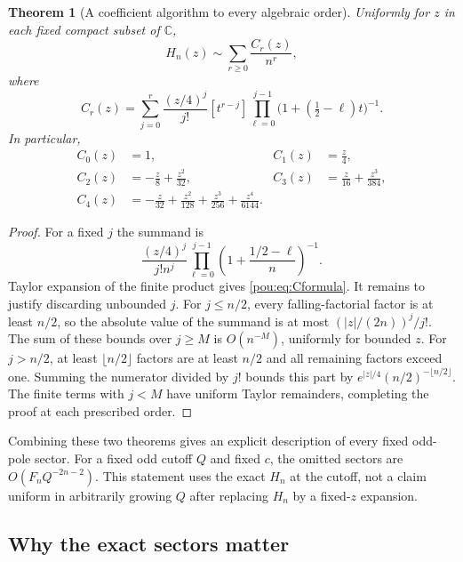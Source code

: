 \documentclass[11pt]{article}
\newtheorem{theorem}{Theorem}[section]
\theoremstyle{definition}
\theoremstyle{remark}
\begin{document}
\begin{theorem}[A coefficient algorithm to every algebraic order]
\label{pou:thm:Hallorders}
Uniformly for $z$ in each fixed compact subset of $\mathbb C$,
\begin{equation}\label{pou:eq:Hexpansion}
 H_n(z)\sim\sum_{r\ge0}\frac{C_r(z)}{n^r},
\end{equation}
where
\begin{equation}\label{pou:eq:Cformula}
 C_r(z)=\sum_{j=0}^r\frac{(z/4)^j}{j!}
 [t^{r-j}]\prod_{\ell=0}^{j-1}
       \bigl(1+(\tfrac12-\ell)t\bigr)^{-1}.
\end{equation}
In particular,
\begin{align*}
 C_0(z)&=1,& C_1(z)&=\frac z4,\\
 C_2(z)&=-\frac z8+\frac{z^2}{32},&
 C_3(z)&=\frac z{16}+\frac{z^3}{384},\\
 C_4(z)&=-\frac z{32}+\frac{z^2}{128}
          +\frac{z^3}{256}+\frac{z^4}{6144}.
\end{align*}
\end{theorem}
\begin{proof}
For a fixed $j$ the summand is
\[
 \frac{(z/4)^j}{j!n^j}
 \prod_{\ell=0}^{j-1}
       \left(1+\frac{1/2-\ell}{n}\right)^{-1}.
\]
Taylor expansion of the finite product gives \eqref{pou:eq:Cformula}.
It remains to justify discarding unbounded $j$.
For $j\le n/2$, every falling-factorial factor is at least $n/2$, so the
absolute value of the summand is at most $(|z|/(2n))^j/j!$.
The sum of these bounds over $j\ge M$ is $O(n^{-M})$, uniformly for bounded
$z$.  For $j>n/2$, at least $\lfloor n/2\rfloor$ factors are at least
$n/2$ and all remaining factors exceed one.  Summing the numerator divided
by $j!$ bounds this part by
$e^{|z|/4}(n/2)^{-\lfloor n/2\rfloor}$.
The finite terms with $j<M$ have uniform Taylor remainders, completing the
proof at each prescribed order.
\end{proof}

Combining these two theorems gives an explicit description of every fixed
odd-pole sector.  For a fixed odd cutoff $Q$ and fixed $c$, the omitted
sectors are $O(F_nQ^{-2n-2})$.  This statement uses the exact $H_n$ at the
cutoff, not a claim uniform in arbitrarily growing $Q$ after replacing
$H_n$ by a fixed-$z$ expansion.

\subsection{Why the exact sectors matter}
\end{document}
